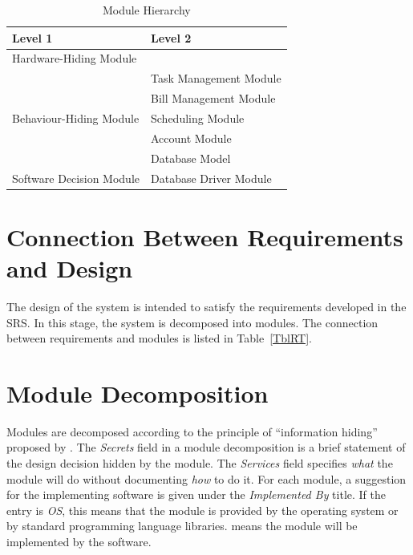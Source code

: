 \documentclass[12pt, titlepage]{article}
\begin{document}
\begin{table}[h!]
\centering
\begin{tabular}{p{} p{}}
\toprule
\textbf{Level 1} & \textbf{Level 2}\\
\midrule

{Hardware-Hiding Module} & ~ \\
\midrule

\multirow{5}{0.3\textwidth}{Behaviour-Hiding Module} 
& Task Management Module\\
& Bill Management Module\\
& Scheduling Module\\
& Account Module\\
& Database Model\\
\midrule

{Software Decision Module}
& Database Driver Module\\
\bottomrule

\end{tabular}
\caption{Module Hierarchy}
\label{TblMH}
\end{table}

\section{Connection Between Requirements and Design} \label{SecConnection}

The design of the system is intended to satisfy the requirements developed in
the SRS. In this stage, the system is decomposed into modules. The connection
between requirements and modules is listed in Table~\ref{TblRT}.

\section{Module Decomposition} \label{SecMD}

Modules are decomposed according to the principle of ``information hiding''
proposed by \citet{ParnasEtAl1984}. The \emph{Secrets} field in a module
decomposition is a brief statement of the design decision hidden by the
module. The \emph{Services} field specifies \emph{what} the module will do
without documenting \emph{how} to do it. For each module, a suggestion for the
implementing software is given under the \emph{Implemented By} title. If the
entry is \emph{OS}, this means that the module is provided by the operating
system or by standard programming language libraries.  \emph{\progname{}} means the
module will be implemented by the \progname{} software.
\end{document}
